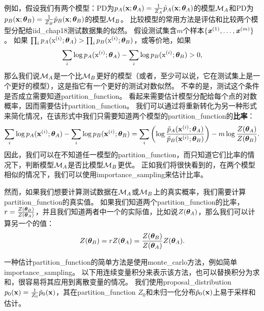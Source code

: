 例如，假设我们有两个模型：\gls{PD}为$p_A(\mathbf{x}; \boldsymbol{\theta}_A)= \frac{1}{Z_A} \tilde{p}_A(\mathbf{x}; \boldsymbol{\theta}_A)$的模型$\mathcal{M}_A$和\gls{PD}为$p_B(\mathbf{x}; \boldsymbol{\theta}_B)= \frac{1}{Z_B} \tilde{p}_B(\mathbf{x}; \boldsymbol{\theta}_B)$的模型$\mathcal{M}_B$。
比较模型的常用方法是评估和比较两个模型分配给\gls{iid_chap18}测试数据集的似然。
假设测试集含$m$个样本$\{ \boldsymbol{\mathit{x}}^{(1)}, \dots, \boldsymbol{\mathit{x}}^{(m)} \}$。
如果 $\prod_i p_A ( \mathrm{x}^{(i)}; \boldsymbol{\theta}_A) > \prod_i p_B( \mathrm{x}^{(i)}; \boldsymbol{\theta}_B)$，或等价地，如果
\begin{equation}
\label{eq:18.38}
	\sum_i \log p_A (\mathrm{x}^{(i)}; \boldsymbol{\theta}_A) - \sum_i \log p_B(\mathrm{x}^{(i)}; \boldsymbol{\theta}_B) > 0,
\end{equation}
那么我们说$\mathcal{M}_A$是一个比$\mathcal{M}_B$更好的模型（或者，至少可以说，它在测试集上是一个更好的模型），这是指它有一个更好的测试对数似然。
不幸的是，测试这个条件是否成立需要知道\gls{partition_function}。
看起来需要估计模型分配给每个点的对数概率，因而需要估计\gls{partition_function}。
我们可以通过将重新转化为另一种形式来简化情况，在该形式中我们只需要知道两个模型的\gls{partition_function}的\textbf{比率}：
\begin{equation}
\label{eq:18.39}
	\sum_i \log p_A(\mathbf{x}^{(i)}; \boldsymbol{\theta}_A) - \sum_i \log p_B(\mathbf{x}^{(i)}; \boldsymbol{\theta}_B) =
	\sum_i \left(  \log \frac{ \tilde{p}_A(\mathbf{x}^{(i)}; \boldsymbol{\theta}_A) }{ \tilde{p}_B(\mathbf{x}^{(i)}; \boldsymbol{\theta}_B) } \right)  - m\log \frac{Z(\boldsymbol{\theta}_A)}{ Z(\boldsymbol{\theta}_B) }.
\end{equation}
因此，我们可以在不知道任一模型的\gls{partition_function}，而只知道它们比率的情况下，判断模型$\mathcal{M}_A$是否比模型$\mathcal{M}_B$更优。
正如我们将很快看到的，在两个模型相似的情况下，我们可以使用\gls{importance_sampling}来估计比率。


然而，如果我们想要计算测试数据在$\mathcal{M}_A$或$\mathcal{M}_B$上的真实概率，我们需要计算\gls{partition_function}的真实值。
如果我们知道两个\gls{partition_function}的比率，$r = \frac{Z(\boldsymbol{\theta}_B)}{ Z(\boldsymbol{\theta}_A) }$，并且我们知道两者中一个的实际值，比如说$Z(\boldsymbol{\theta}_A)$，那么我们可以计算另一个的值：
\begin{equation}
	Z(\boldsymbol{\theta}_B) = r Z(\boldsymbol{\theta}_A) = \frac{ Z(\boldsymbol{\theta}_B) }{ Z(\boldsymbol{\theta}_A) } Z(\boldsymbol{\theta}_A).
\end{equation}


一种估计\gls{partition_function}的简单方法是使用\gls{monte_carlo}方法，例如简单\gls{importance_sampling}。
以下用连续变量积分来表示该方法，也可以替换积分为求和，很容易将其应用到离散变量的情况。
我们使用\gls{proposal_distribution} $p_0(\mathbf{x}) = \frac{1}{Z_0} \tilde{p}_0( \mathbf{x})$，其在\gls{partition_function} $Z_0$和未归一化分布$\tilde{p}_0(\mathbf{x})$上易于采样和估计。

